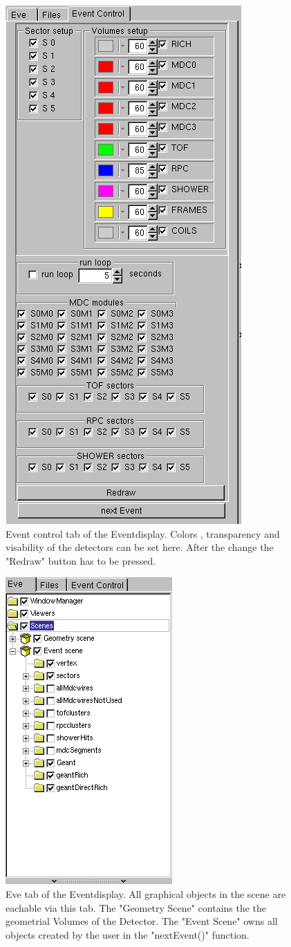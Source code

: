 \begin{figure}[\htb]
\begin{center}
\includegraphics[width=0.4\linewidth,clip=true]{pics/eventdisplay/eventControl.png}
\caption[Eventdisplay event control]{Event control tab of the Eventdisplay. Colors , transparency 
and visability of the detectors can be set here. After the change the "Redraw" button has 
to be pressed.} \label{eventdisplay_control}
\end{center}
\end{figure}

\begin{figure}[\htb]
\begin{center}
\includegraphics[width=0.4\linewidth,clip=true]{pics/eventdisplay/eveTree.png}
\caption[Eventdisplay eve tab]{Eve tab of the Eventdisplay. All graphical objects in the scene 
are eachable via this tab. The "Geometry Scene" contains the the geometrial Volumes
of the Detector. The "Event Scene" owns all objects created by the user in the "nextEvent()" 
function.} \label{eventdisplay_tree}
\end{center}
\end{figure}

